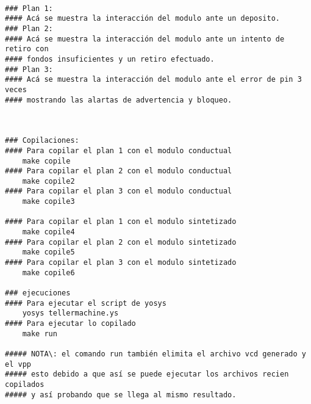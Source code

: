 \begin{verbatim}
    
### Plan 1:
#### Acá se muestra la interacción del modulo ante un deposito.
### Plan 2:
#### Acá se muestra la interacción del modulo ante un intento de retiro con
#### fondos insuficientes y un retiro efectuado.
### Plan 3:
#### Acá se muestra la interacción del modulo ante el error de pin 3 veces
#### mostrando las alartas de advertencia y bloqueo.



### Copilaciones:
#### Para copilar el plan 1 con el modulo conductual
    make copile
#### Para copilar el plan 2 con el modulo conductual
    make copile2
#### Para copilar el plan 3 con el modulo conductual
    make copile3

#### Para copilar el plan 1 con el modulo sintetizado
    make copile4
#### Para copilar el plan 2 con el modulo sintetizado
    make copile5
#### Para copilar el plan 3 con el modulo sintetizado
    make copile6

### ejecuciones
#### Para ejecutar el script de yosys
    yosys tellermachine.ys
#### Para ejecutar lo copilado
    make run

##### NOTA\: el comando run también elimita el archivo vcd generado y el vpp
##### esto debido a que así se puede ejecutar los archivos recien copilados
##### y así probando que se llega al mismo resultado.

\end{verbatim}